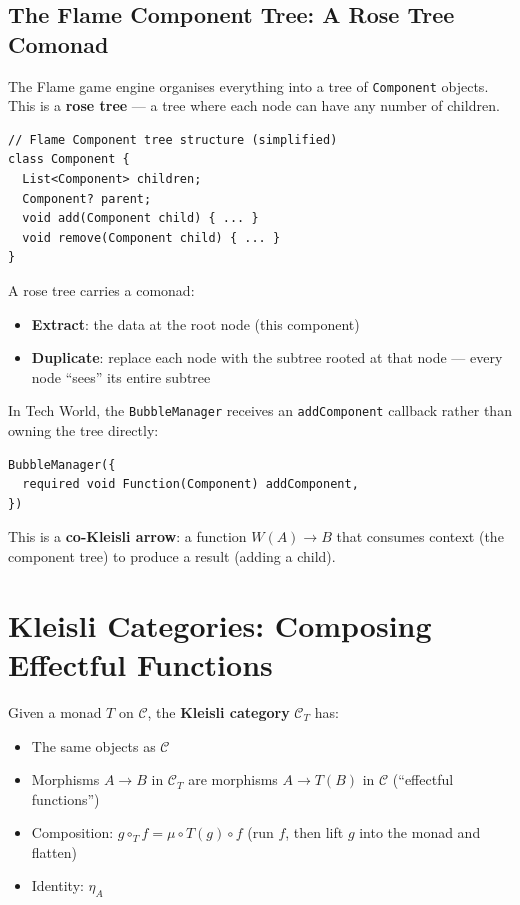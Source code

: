 \documentclass[12pt,a4paper]{article}
\theoremstyle{definition}
\theoremstyle{plain}
\theoremstyle{remark}
\begin{document}
\subsection{The Flame Component Tree: A Rose Tree Comonad}

The Flame game engine organises everything into a tree of \texttt{Component}
objects. This is a \textbf{rose tree} --- a tree where each node can have
any number of children.

\begin{lstlisting}
// Flame Component tree structure (simplified)
class Component {
  List<Component> children;
  Component? parent;
  void add(Component child) { ... }
  void remove(Component child) { ... }
}
\end{lstlisting}

A rose tree carries a comonad:
\begin{itemize}
  \item \textbf{Extract}: the data at the root node (this component)
  \item \textbf{Duplicate}: replace each node with the subtree rooted at
        that node --- every node ``sees'' its entire subtree
\end{itemize}

In Tech World, the \texttt{BubbleManager} receives an \texttt{addComponent}
callback rather than owning the tree directly:
\begin{lstlisting}
BubbleManager({
  required void Function(Component) addComponent,
})
\end{lstlisting}
This is a \textbf{co-Kleisli arrow}: a function $W(A) \to B$ that
consumes context (the component tree) to produce a result (adding a child).


\section{Kleisli Categories: Composing Effectful Functions}
\label{sec:kleisli}

\begin{formal}
Given a monad $T$ on $\mathcal{C}$, the \textbf{Kleisli category}
$\mathcal{C}_T$ has:
\begin{itemize}
  \item The same objects as $\mathcal{C}$
  \item Morphisms $A \to B$ in $\mathcal{C}_T$ are morphisms
        $A \to T(B)$ in $\mathcal{C}$ (``effectful functions'')
  \item Composition: $g \circ_T f = \mu \circ T(g) \circ f$
        (run $f$, then lift $g$ into the monad and flatten)
  \item Identity: $\eta_A$
\end{itemize}
\end{formal}
\end{document}
